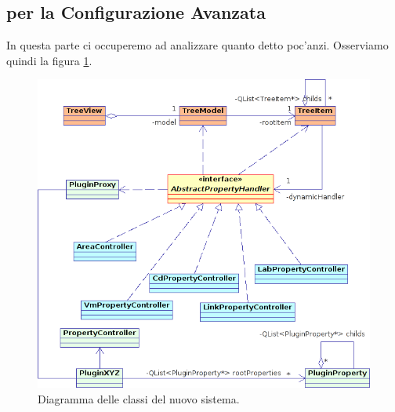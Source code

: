 \subsection{\plugin{} per la Configurazione Avanzata}
In questa parte ci occuperemo ad analizzare quanto detto poc'anzi. Osserviamo quindi la figura \ref{figura:properties_uml1}.

\begin{figure}[!htb]
	\centering
	\includegraphics[width=12cm]{images/properties_uml1.png}
	\caption{Diagramma delle classi del nuovo sistema.}
	\label{figura:properties_uml1}
\end{figure}

